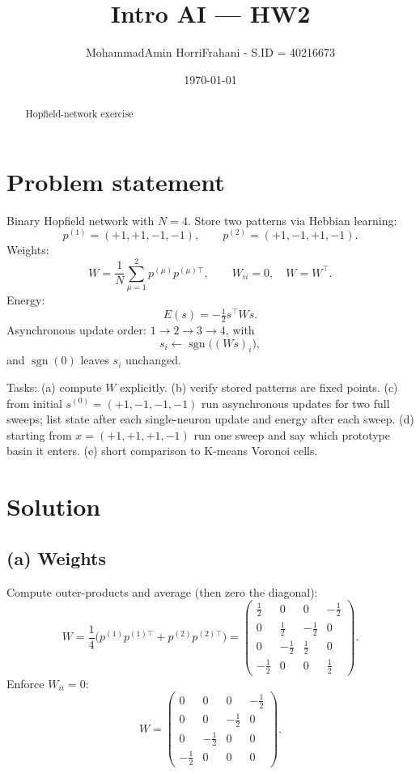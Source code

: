 \documentclass[11pt,a4paper]{article}
\title{Intro AI — HW2}
\author{MohammadAmin HorriFrahani - S.ID = 40216673}
\date{\today}
\begin{document}
\maketitle

\begin{abstract}
Hopfield-network exercise
\end{abstract}

\tableofcontents
\newpage

\section{Problem statement}
Binary Hopfield network with \(N=4\). Store two patterns via Hebbian learning:
\[
p^{(1)}=(+1,+1,-1,-1),\qquad p^{(2)}=(+1,-1,+1,-1).
\]
Weights:
\[
W=\frac{1}{N}\sum_{\mu=1}^2 p^{(\mu)} p^{(\mu)\top},\qquad W_{ii}=0,\quad W=W^\top.
\]
Energy:
\[
E(s)=-\tfrac12 s^\top W s.
\]
Asynchronous update order: \(1\to2\to3\to4\), with
\[
s_i\leftarrow \operatorname{sgn}\big((W s)_i\big),
\]
and \(\operatorname{sgn}(0)\) leaves \(s_i\) unchanged.

Tasks: (a) compute \(W\) explicitly. (b) verify stored patterns are fixed points. (c) from initial \(s^{(0)}=(+1,-1,-1,-1)\) run asynchronous updates for two full sweeps; list state after each single-neuron update and energy after each sweep. (d) starting from \(x=(+1,+1,+1,-1)\) run one sweep and say which prototype basin it enters. (e) short comparison to K-means Voronoi cells.

\section{Solution}

\subsection{(a) Weights}
Compute outer-products and average (then zero the diagonal):
\[
W=\frac{1}{4}\big(p^{(1)}p^{(1)\top}+p^{(2)}p^{(2)\top}\big)
=\begin{pmatrix}
\frac12 & 0 & 0 & -\frac12\\[4pt]
0 & \frac12 & -\frac12 & 0\\[4pt]
0 & -\frac12 & \frac12 & 0\\[4pt]
-\frac12 & 0 & 0 & \frac12
\end{pmatrix}.
\]
Enforce \(W_{ii}=0\):
\[
\boxed{W=\begin{pmatrix}
0 & 0 & 0 & -\tfrac12\\[4pt]
0 & 0 & -\tfrac12 & 0\\[4pt]
0 & -\tfrac12 & 0 & 0\\[4pt]
-\tfrac12 & 0 & 0 & 0
\end{pmatrix}.}
\]
\end{document}
